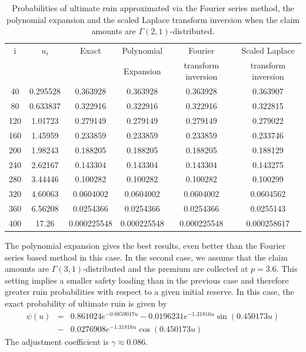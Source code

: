 \begin{table}
\begin{center}
\begin{tabular}{|c|c||c|c|c|c|}
  \hline
i&$u_{i}$&Exact&Polynomial &Fourier& Scaled Laplace\\
   && &Expansion& transform inversion &transform inversion \\
\hline
  \hline
40& 0.295528 & 0.363928 & 0.363928 & 0.363928 & 0.363907 \\
80& 0.633837 & 0.322916 & 0.322916 & 0.322916 & 0.322815 \\
120& 1.01723 & 0.279149 & 0.279149 & 0.279149 & 0.279022 \\
 160&1.45959 & 0.233859 & 0.233859 & 0.233859 & 0.233746 \\
200& 1.98243 & 0.188205 & 0.188205 & 0.188205 & 0.188129 \\
240& 2.62167 & 0.143304 & 0.143304 & 0.143304 & 0.143275 \\
280& 3.44446 & 0.100282 & 0.100282 & 0.100282 & 0.100299 \\
320& 4.60063 & 0.0604002 & 0.0604002 & 0.0604002 & 0.0604562 \\
360& 6.56208 & 0.0254366 & 0.0254366 & 0.0254366 & 0.0255143 \\
400& 17.26 & 0.000225548 & 0.000225548 & 0.000225548 & 0.000258617 \\
  \hline
\end{tabular} 
\caption{Probabilities of ultimate ruin approximated via the Fourier series method, the polynomial expansion and the scaled Laplace transform inversion when the claim amounts are $\Gamma(2,1)$-distributed.}\label{RuinProbaTableGamma21}
\end{center}
\end{table}
The polynomial expansion gives the best results, even better than the Fourier series based method in this case. In the second case, we assume that the claim amounts are $\Gamma(3,1)$-distributed and the premium are collected at $p=3.6$. This setting implies a smaller safety loading than in the previous case and therefore greater ruin probabilities with respect to a given initial reserve. In this case, the exact probability of ultimate ruin is given by
\begin{eqnarray*}\label{ExactRuinProbabilityGamma31}
\psi(u)&=& 0.861024e^{-0.0859017 u}-0.0196231e^{-1.31816
   u} \sin (0.450173 u)\\
&-&0.0276908e^{-1.31816 u} \cos (0.450173 u)
\end{eqnarray*}
The adjustment coefficient is $\gamma \approx 0.086$.\\

